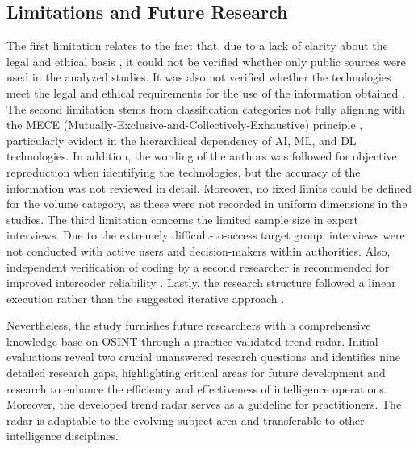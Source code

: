 \documentclass[10pt]{article}
\begin{document}
\subsection{Limitations and Future Research}

The first limitation relates to the fact that, due to a lack of clarity about the legal
and ethical basis \cite{Ghioni.2023,Wittmer.2022},
it could not be verified whether only public sources \cite{NorthAtlanticTreatyOrganization.2002} were used
in the analyzed studies. It was also not verified whether the technologies meet the
legal and ethical requirements for the use of the information obtained
\cite{PastorGalindo.2020,Wittmer.2022}. The second
limitation stems from classification categories not fully aligning with the
MECE (Mutually-Exclusive-and-Collectively-Exhaustive) principle \cite{Lee.2018},
particularly evident in the hierarchical dependency of AI, ML, and DL technologies. In addition,
the wording of the authors was followed for objective reproduction when identifying the technologies,
but the accuracy of the information was not reviewed in detail. Moreover, no fixed limits could be defined
for the volume category, as these were not recorded in uniform dimensions in the studies.
The third limitation concerns the limited sample size in expert interviews. Due to the
extremely difficult-to-access target group, interviews were not conducted with active users and decision-makers within authorities.
Also, independent verification of coding by a second researcher is recommended for improved intercoder reliability
\cite{Bogner.2002c, Glaser.2009}. Lastly, the research structure followed a linear execution rather than the suggested iterative approach \cite{Peffers.2007}.

Nevertheless, the study furnishes future researchers with a comprehensive knowledge base on OSINT
through a practice-validated trend radar.
Initial evaluations reveal two crucial unanswered research questions and identifies nine detailed research gaps, highlighting
critical areas for future development and research to enhance the efficiency and effectiveness of intelligence operations.
Moreover, the developed trend radar serves as a guideline for practitioners. The radar
is adaptable to the evolving subject area and transferable to other intelligence disciplines.
\end{document}
